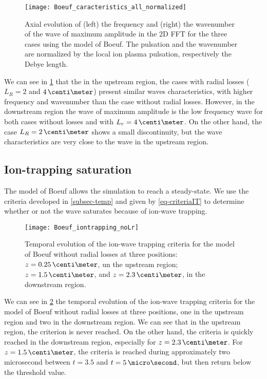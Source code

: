\begin{figure}[hbt]
  \centering
  \texttt{[image: Boeuf\_caracteristics\_all\_normalized]}
  \caption{Axial evolution of (left) the frequency and (right) the wavenumber of the wave of maximum amplitude in the \ac{2D} \ac{FFT} for the three cases using the model of Boeuf. The pulsation and the wavenumber are normalized by the local ion plasma pulsation, respectively the Debye length.}
  \label{fig-axial_maxwave_normalized}
\end{figure}

We can see in \cref{fig-axial_maxwave_normalized} that the in the upstream region, the cases with radial losses ($L_R=2$ and $4\,\centi\meter$) present similar waves characteristics, with higher frequency and wavenumber than the case without radial losses.
However, in the downstream region the wave of maximum amplitude is the low frequency wave for both cases without losses and with $L_r=4\,\centi\meter$.
On the other hand, the case $L_R=2\,\centi\meter$ shows a small discontinuity, but the wave characteristics are very close to the wave in the upstream region.


\subsection{Ion-trapping saturation } \label{subsec-boeuf_iontrapping}

The model of Boeuf allows the simulation to reach a steady-state.
We use the criteria developed in \cref{subsec-temp} and given by \cref{eq-criteriaIT} to determine whether or not the wave saturates because of ion-wave trapping.

\begin{figure}[hbt]
  \centering
  \texttt{[image: Boeuf\_iontrapping\_noLr]}
  \caption{Temporal evolution of the ion-wave trapping criteria for the model of Boeuf without radial losses at three positions\string: $z=0.25\,\centi\meter$, un the upstream region; $z=1.5\,\centi\meter$, and $z=2.3\,\centi\meter$, in the downstream region.}
  \label{fig-ion-trap_temp_noLr}
\end{figure}

We can see in \cref{fig-ion-trap_temp_noLr} the temporal evolution of the ion-wave trapping criteria for the model of Boeuf without radial losses at three positions, one in the upstream region and two in the downstream region.
We can see that in the upstream region, the criterion is never reached.
On the other hand, the criteria is quickly reached in the downstream region, especially for $z=2.3\,\centi\meter$.
For $z=1.5\,\centi\meter$, the criteria is reached during approximately two microsecond between $t=3.5$ and $t=5\,\micro\second$, but then return below the threshold value.

